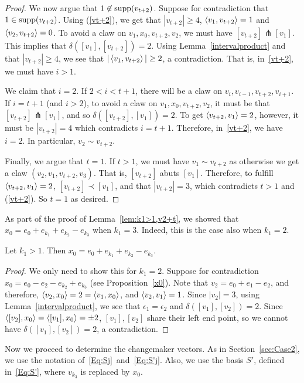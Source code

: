 \begin{proof}
We now argue that $1\not \in \operatorname{supp}(v_{t+2})$. Suppose for contradiction that $1\in \operatorname{supp}(v_{t+2})$. Using (\ref{vt+2}), we get
 that $|v_{t+2}|\ge 4$, $\left\langle v_1 , v_{t+2} \right\rangle=1$ and $\left\langle v_2 , v_{t+2} \right\rangle=0$. To avoid a claw on $v_1, x_0, v_{t+2}, v_2$, we must have $[v_{t+2}]\pitchfork [v_1]$. This implies that $\delta([v_1], [v_{t+2}])=2$. Using Lemma~\ref{intervalproduct} and that $|v_{t+2}|\ge 4$, we see that $|\left\langle v_1 , v_{t+2} \right\rangle|\ge 2$, a contradiction. That is, in~\eqref{vt+2}, we must have $i>1$. 

We claim that $i=2$. If $2<i<t+1$, there will be a claw on $v_i, v_{i-1}, v_{t+2}, v_{i+1}$. If $i=t+1$ (and $i>2$), to avoid a claw on $v_1, x_0, v_{t+2}, v_2$, it must be that $[v_{t+2}]\pitchfork [v_1]$, and so $\delta([v_{t+2}], [v_1])=2$. To get $\left\langle v_{t+2} , v_1 \right\rangle=2$, however, it must be $|v_{t+2}|=4$ which contradicts $i=t+1$. Therefore, in~\eqref{vt+2}, we have $i=2$. In particular, $v_2\sim v_{t+2}$.

Finally, we argue that $t=1$. If $t>1$, we must have $v_1\sim v_{t+2}$ as otherwise we get a claw $(v_2, v_1, v_{t+2}, v_3)$. That is, $[v_{t+2}]$ abuts $[v_1]$. Therefore, to fulfill $\left\langle v_{t+2} , v_1 \right\rangle=2$, $[v_{t+2}]\prec[v_1]$, and that $|v_{t+2}|=3$, which contradicts $t>1$ and (\ref{vt+2}). So $t=1$ as desired.
\end{proof}

As part of the proof of Lemma~\ref{lem:k1>1,v2+t}, we showed that $x_0 = e_0+e_{k_1}+e_{k_2}-e_{k_3}$ when $k_1=3$. Indeed, this is the case also when $k_1=2$.

\begin{lemma}\label{lem:k1>1, chi=2}
		Let $k_1>1$. Then $x_0 = e_0+e_{k_1}+e_{k_2}-e_{k_3}$.
\end{lemma}

\begin{proof}
We only need to show this for $k_1=2$. Suppose for contradiction $x_0 = e_0-e_{2}-e_{k_2}+e_{k_3}$ (see Proposition~\ref{x0}). Note that $v_2=e_0+e_1-e_2$, and therefore, $\left\langle v_2 , x_0 \right\rangle=2=\left\langle v_1 , x_0 \right\rangle$, and $\left\langle v_2 , v_1 \right\rangle=1$. Since $|v_2|=3$, using Lemma~\ref{intervalproduct}, we see that $\epsilon_1=\epsilon_2$ and $\delta([v_1],[v_2])=2$. Since $\left\langle [v_2] , x_0 \right\rangle=\left\langle [v_1] , x_0 \right\rangle=\pm2$, $[v_1],[v_2]$ share their left end point, so we cannot have $\delta([v_1],[v_2])=2$, a contradiction.
\end{proof}

Now we proceed to determine the changemaker vectors. As in Section~\ref{sec:Case2}, we use the notation of~\eqref{Eq:Sj}~and~\eqref{Eq:S'j}. Also, we use the basis $S'$, defined in~\eqref{Eq:S'}, where $v_{k_3}$ is replaced by $x_0$.





